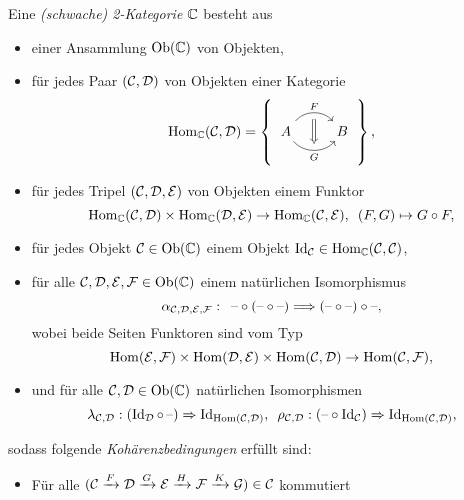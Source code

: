 \documentclass{cheat-sheet}
\newenvironment{centertikzcd}
  {\begin{center}\begin{tikzcd}}
  {\end{tikzcd}\end{center}}
\begin{document}
\begin{defn}
  Eine \emph{(schwache) 2-Kategorie} $\mathbb{C}$ besteht aus
  \begin{itemize}
    \item einer Ansammlung $\operatorname{Ob}(\mathbb{C})$ von Objekten,
    \item für jedes Paar $(\mathcal{C}, \mathcal{D})$ von Objekten einer Kategorie
    \[
      \Hom_{\C}(\Cat, \Dat) = \left\{\,
      \begin{tikzcd}
        A \arrow[r, bend left=50, "F"{above}, ""{name=U, below}]
        \arrow[r, bend right=50, "G"{below}, ""{name=D, above}]
        & B
        \arrow[Rightarrow, from=U, to=D]
      \end{tikzcd}
      \,\right\},
    \]
    \item für jedes Tripel $(\mathcal{C}, \mathcal{D}, \mathcal{E})$ von Objekten einem Funktor
    \[
      \operatorname{Hom}_{\mathbb{C}}(\mathcal{C}, \mathcal{D}) \times \operatorname{Hom}_{\mathbb{C}}(\mathcal{D}, \mathcal{E}) \to \operatorname{Hom}_{\mathbb{C}}(\mathcal{C}, \mathcal{E}), \enspace
      (F, G) \mapsto G \circ F,
    \]
    \item für jedes Objekt $\mathcal{C} \in \operatorname{Ob}(\mathbb{C})$ einem Objekt $\operatorname{Id}_{\mathcal{C}} \in \operatorname{Hom}_{\mathbb{C}}(\mathcal{C}, \mathcal{C})$,
    \item für alle $\mathcal{C}, \mathcal{D}, \mathcal{E}, \mathcal{F} \in \operatorname{Ob}(\mathbb{C})$ einem natürlichen Isomorphismus
    \[ \alpha_{\mathcal{C}, \mathcal{D}, \mathcal{E}, \mathcal{F}} : \enspace \text{--} \circ (\text{--} \circ \text{--}) \Longrightarrow (\text{--} \circ \text{--}) \circ \text{--}, \]
    wobei beide Seiten Funktoren sind vom Typ
    \[ \operatorname{Hom}(\mathcal{E}, \mathcal{F}) \times \operatorname{Hom}(\mathcal{D}, \mathcal{E}) \times \operatorname{Hom}(\mathcal{C}, \mathcal{D}) \to \operatorname{Hom}(\mathcal{C}, \mathcal{F}), \]
    \iffalse
    \begin{centertikzcd}[column sep=1cm, row sep=0.5cm]
      & \Hom(\Cat, \Eat) \times \Hom(\Eat, \Fat) \arrow[rd] \\
      \Hom(\Cat, \Dat) \times \Hom(\Dat, \Eat) \times \Hom(\Eat, \Fat) \arrow[ru] \arrow[rd] & \Hom(\Cat, \Fat) \\
      & \Hom(\Cat, \Dat) \times \Hom(\Dat, \Fat)
    \end{centertikzcd}
    \fi
    \item und für alle $\mathcal{C}, \mathcal{D} \in \operatorname{Ob}(\mathbb{C})$ natürlichen Isomorphismen
    \[
      \lambda_{\mathcal{C}, \mathcal{D}} : (\operatorname{Id}_{\mathcal{D}} \circ \, \text{--}) \Rightarrow \operatorname{Id}_{\operatorname{Hom}(\mathcal{C}, \mathcal{D})}, \enspace
      \rho_{\mathcal{C}, \mathcal{D}} : (\text{--} \circ \operatorname{Id}_{\mathcal{C}}) \Rightarrow \operatorname{Id}_{\operatorname{Hom}(\mathcal{C}, \mathcal{D})},
    \]
  \end{itemize}
  sodass folgende \emph{Kohärenzbedingungen} erfüllt sind:
  \begin{itemize}
    \item Für alle $(\mathcal{C} \xrightarrow{F} \mathcal{D} \xrightarrow{G} \mathcal{E} \xrightarrow{H} \mathcal{F} \xrightarrow{K} \mathcal{G}) \in \mathcal{C}$ kommutiert

\end{itemize}
\end{defn}
\end{document}
